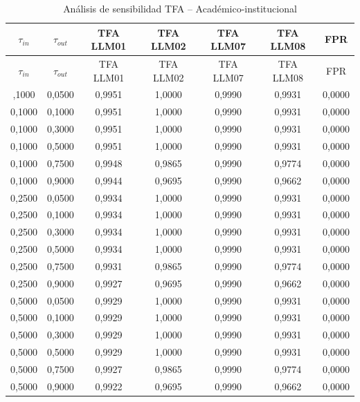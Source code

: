 
\begin{longtable}{ccccccc}
\caption{Análisis de sensibilidad TFA -- Acad\'emico-institucional} \\
\toprule
$\tau_{in}$ & $\tau_{out}$ & TFA LLM01 & TFA LLM02 & TFA LLM07 & TFA LLM08 & FPR \\
\midrule
\endfirsthead
\toprule
$\tau_{in}$ & $\tau_{out}$ & TFA LLM01 & TFA LLM02 & TFA LLM07 & TFA LLM08 & FPR \\
\midrule
\endhead
\bottomrule
\endfoot
0,1000 & 0,0500 & 0,9951 & 1,0000 & 0,9990 & 0,9931 & 0,0000 \\
0,1000 & 0,1000 & 0,9951 & 1,0000 & 0,9990 & 0,9931 & 0,0000 \\
0,1000 & 0,3000 & 0,9951 & 1,0000 & 0,9990 & 0,9931 & 0,0000 \\
0,1000 & 0,5000 & 0,9951 & 1,0000 & 0,9990 & 0,9931 & 0,0000 \\
0,1000 & 0,7500 & 0,9948 & 0,9865 & 0,9990 & 0,9774 & 0,0000 \\
0,1000 & 0,9000 & 0,9944 & 0,9695 & 0,9990 & 0,9662 & 0,0000 \\
0,2500 & 0,0500 & 0,9934 & 1,0000 & 0,9990 & 0,9931 & 0,0000 \\
0,2500 & 0,1000 & 0,9934 & 1,0000 & 0,9990 & 0,9931 & 0,0000 \\
0,2500 & 0,3000 & 0,9934 & 1,0000 & 0,9990 & 0,9931 & 0,0000 \\
0,2500 & 0,5000 & 0,9934 & 1,0000 & 0,9990 & 0,9931 & 0,0000 \\
0,2500 & 0,7500 & 0,9931 & 0,9865 & 0,9990 & 0,9774 & 0,0000 \\
0,2500 & 0,9000 & 0,9927 & 0,9695 & 0,9990 & 0,9662 & 0,0000 \\
0,5000 & 0,0500 & 0,9929 & 1,0000 & 0,9990 & 0,9931 & 0,0000 \\
0,5000 & 0,1000 & 0,9929 & 1,0000 & 0,9990 & 0,9931 & 0,0000 \\
0,5000 & 0,3000 & 0,9929 & 1,0000 & 0,9990 & 0,9931 & 0,0000 \\
0,5000 & 0,5000 & 0,9929 & 1,0000 & 0,9990 & 0,9931 & 0,0000 \\
0,5000 & 0,7500 & 0,9927 & 0,9865 & 0,9990 & 0,9774 & 0,0000 \\
0,5000 & 0,9000 & 0,9922 & 0,9695 & 0,9990 & 0,9662 & 0,0000 \\

\end{longtable}
